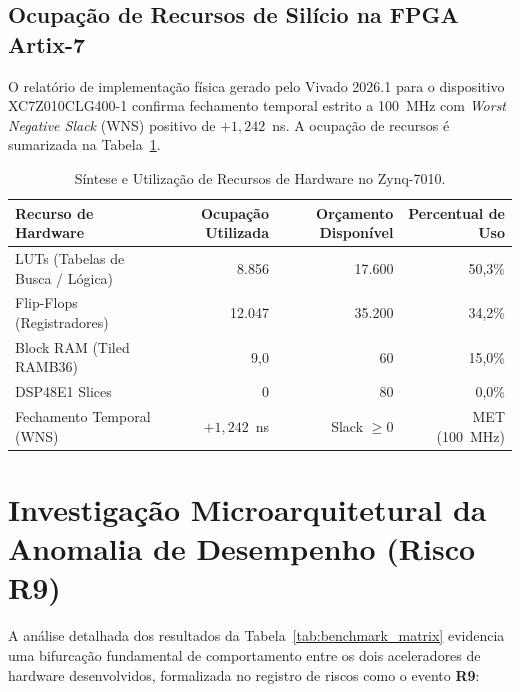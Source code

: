 \documentclass[11pt,a4paper]{article}
\begin{document}
\subsection{Ocupação de Recursos de Silício na FPGA Artix-7}
O relatório de implementação física gerado pelo Vivado 2026.1 para o dispositivo XC7Z010CLG400-1 confirma fechamento temporal estrito a 100~MHz com \textit{Worst Negative Slack} (WNS) positivo de $+1,242$~ns. A ocupação de recursos é sumarizada na Tabela~\ref{tab:resources}.

\begin{table}[htbp]
  \centering
  \small
  \caption{Síntese e Utilização de Recursos de Hardware no Zynq-7010.}
  \label{tab:resources}
  \begin{tabular}{@{}lrrr@{}}
    \toprule
    \textbf{Recurso de Hardware} & \textbf{Ocupação Utilizada} & \textbf{Orçamento Disponível} & \textbf{Percentual de Uso} \\
    \midrule
    LUTs (Tabelas de Busca / Lógica) & 8.856 & 17.600 & 50,3\% \\
    Flip-Flops (Registradores) & 12.047 & 35.200 & 34,2\% \\
    Block RAM (Tiled RAMB36) & 9,0 & 60 & 15,0\% \\
    DSP48E1 Slices & 0 & 80 & 0,0\% \\
    Fechamento Temporal (WNS) & $+1,242$~ns & Slack $\ge 0$ & MET (100~MHz) \\
    \bottomrule
  \end{tabular}
\end{table}

\section{Investigação Microarquitetural da Anomalia de Desempenho (Risco R9)}

A análise detalhada dos resultados da Tabela~\ref{tab:benchmark_matrix} evidencia uma bifurcação fundamental de comportamento entre os dois aceleradores de hardware desenvolvidos, formalizada no registro de riscos como o evento \textbf{R9}:
\end{document}
